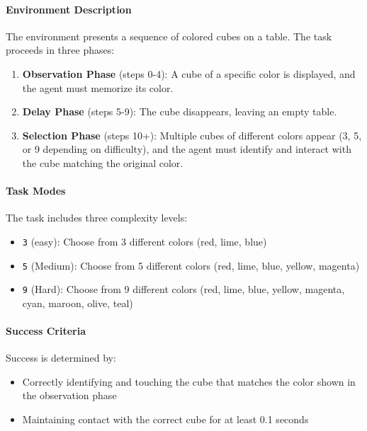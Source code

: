 \paragraph{Environment Description} The environment presents a sequence of colored cubes on a table. The task proceeds in three phases:
\begin{enumerate}
    \item \textbf{Observation Phase} (steps 0-4): A cube of a specific color is displayed, and the agent must memorize its color.
    \item \textbf{Delay Phase} (steps 5-9): The cube disappears, leaving an empty table.
    \item \textbf{Selection Phase} (steps 10+): Multiple cubes of different colors appear (3, 5, or 9 depending on difficulty), and the agent must identify and interact with the cube matching the original color.
\end{enumerate}

\paragraph{Task Modes} The task includes three complexity levels:
\begin{itemize}
    \item \texttt{3} (easy): Choose from 3 different colors (red, lime, blue)
    \item \texttt{5} (Medium): Choose from 5 different colors (red, lime, blue, yellow, magenta)
    \item \texttt{9} (Hard): Choose from 9 different colors (red, lime, blue, yellow, magenta, cyan, maroon, olive, teal)
\end{itemize}

\paragraph{Success Criteria} Success is determined by:
\begin{itemize}
    \item Correctly identifying and touching the cube that matches the color shown in the observation phase
    \item Maintaining contact with the correct cube for at least 0.1 seconds
\end{itemize}

